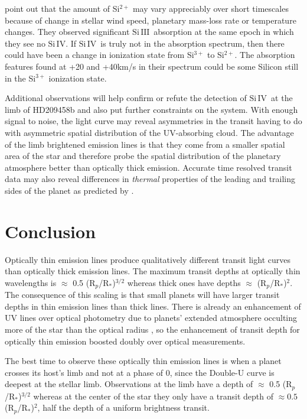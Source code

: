 \documentclass[twocolumn]{emulateapj}
\newcommand{\siIV}{\ensuremath{\mathrm{Si}\,\scriptstyle \mathrm{IV}}}
\newcommand{\siIII}{\ensuremath{\mathrm{Si}\,\scriptstyle \mathrm{III}}}
\newcommand{\p}{R$_p$/R$_*$}
\begin{document}
\citet{linsky} point out that the amount of Si$^{2+}$ may vary appreciably over short timescales because of change in stellar wind speed, planetary mass-loss rate or temperature changes. They observed significant \siIII\ absorption at the same epoch in which they see no \siIV. If \siIV\ is truly not in the absorption spectrum, then there could have been a change in ionization state from Si$^{3+}$ to Si$^{2+}$. The absorption features found at +20 and +40km/s in their spectrum could be some Silicon still in the Si$^{3+}$ ionization state.

Additional observations will help confirm or refute the detection of \siIV\ at the limb of HD209458b and also put further constraints on the system. With enough signal to noise, the light curve may reveal asymmetries in the transit having to do with asymmetric spatial distribution of the UV-absorbing cloud. The advantage of the limb brightened emission lines is that they come from a smaller spatial area of the star and therefore probe the spatial distribution of the planetary atmosphere better than optically thick emission. Accurate time resolved transit data may also reveal differences in {\it thermal} properties of the leading and trailing sides of the planet as predicted by \citet{fortney}.

\section{Conclusion}

Optically thin emission lines produce qualitatively different transit light curves than optically thick emission lines. The maximum transit depths at optically thin wavelengths is $\approx$ 0.5 (\p )$^{3/2}$ whereas thick ones have depths $\approx$ (\p )$^2$. The consequence of this scaling is that small planets will have larger transit depths in thin emission lines than thick lines. There is already an enhancement of UV lines over optical photometry due  to planets' extended atmosphere occulting more of the star than the optical radius \citep{kosk}, so the enhancement of transit depth for optically thin emission boosted doubly over optical measurements.

The best time to observe these optically thin emission lines is when a planet crosses its host's limb and not at a phase of 0, since the Double-U curve is deepest at the stellar limb. Observations at the limb have a depth of $\approx$ 0.5 (\p )$^{3/2}$ whereas at the center of the star they only have a transit depth of  $\approx 0.5 $(\p)$^2$, half the depth of a uniform brightness transit.
\end{document}
